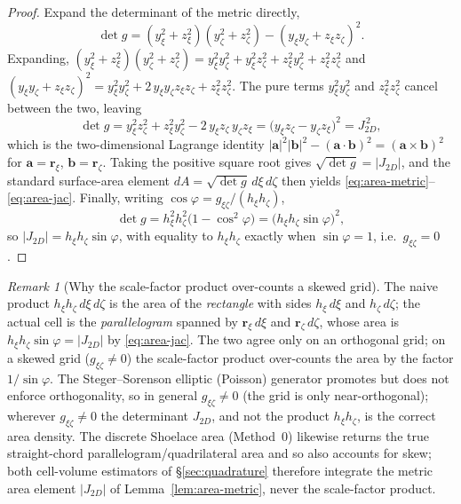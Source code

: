 \documentclass[11pt]{article}
\theoremstyle{definition}
\theoremstyle{remark}
\newtheorem{remark}{Remark}
\begin{document}
\begin{proof}
Expand the determinant of the metric directly,
\begin{equation}
\det g
=(y_\xi^2+z_\xi^2)(y_\zeta^2+z_\zeta^2)
 -(y_\xi y_\zeta+z_\xi z_\zeta)^2 .
\label{eq:detg-expand}
\end{equation}
Expanding,
$(y_\xi^2+z_\xi^2)(y_\zeta^2+z_\zeta^2)=y_\xi^2 y_\zeta^2+y_\xi^2 z_\zeta^2+z_\xi^2 y_\zeta^2+z_\xi^2 z_\zeta^2$
and
$(y_\xi y_\zeta+z_\xi z_\zeta)^2=y_\xi^2 y_\zeta^2+2\,y_\xi y_\zeta z_\xi z_\zeta+z_\xi^2 z_\zeta^2$.
The pure terms $y_\xi^2 y_\zeta^2$ and $z_\xi^2 z_\zeta^2$ cancel between the two,
leaving
\begin{equation}
\det g
=y_\xi^2 z_\zeta^2+z_\xi^2 y_\zeta^2-2\,y_\xi z_\zeta\,y_\zeta z_\xi
=\bigl(y_\xi z_\zeta-y_\zeta z_\xi\bigr)^2
=J_{2D}^{\,2},
\label{eq:lagrange-collapse}
\end{equation}
which is the two-dimensional Lagrange identity
$|\mathbf a|^2|\mathbf b|^2-(\mathbf a\!\cdot\!\mathbf b)^2=(\mathbf a\times\mathbf b)^2$
for $\mathbf a=\mathbf r_\xi$, $\mathbf b=\mathbf r_\zeta$. Taking the positive
square root gives $\sqrt{\det g}=|J_{2D}|$, and the standard surface-area element
$dA=\sqrt{\det g}\,d\xi\,d\zeta$ then yields \eqref{eq:area-metric}--\eqref{eq:area-jac}.
Finally, writing $\cos\varphi=g_{\xi\zeta}/(h_\xi h_\zeta)$,
\begin{equation}
\det g
=h_\xi^2 h_\zeta^2\bigl(1-\cos^2\varphi\bigr)
=\bigl(h_\xi h_\zeta\sin\varphi\bigr)^2,
\label{eq:detg-sin}
\end{equation}
so $|J_{2D}|=h_\xi h_\zeta\sin\varphi$, with equality to $h_\xi h_\zeta$ exactly
when $\sin\varphi=1$, i.e.\ $g_{\xi\zeta}=0$.
\end{proof}

\begin{remark}[Why the scale-factor product over-counts a skewed grid]
\label{rem:skew}
The naive product $h_\xi h_\zeta\,d\xi\,d\zeta$ is the area of the
\emph{rectangle} with sides $h_\xi\,d\xi$ and $h_\zeta\,d\zeta$; the actual cell
is the \emph{parallelogram} spanned by $\mathbf r_\xi\,d\xi$ and
$\mathbf r_\zeta\,d\zeta$, whose area is $h_\xi h_\zeta\sin\varphi=|J_{2D}|$ by
\eqref{eq:area-jac}. The two agree only on an orthogonal grid; on a skewed grid
($g_{\xi\zeta}\ne0$) the scale-factor product over-counts the area by the factor
$1/\sin\varphi$. The Steger--Sorenson elliptic (Poisson) generator promotes but
does not enforce orthogonality, so in general $g_{\xi\zeta}\neq0$ (the grid is only
near-orthogonal); wherever $g_{\xi\zeta}\neq0$ the determinant $J_{2D}$, and not the
product $h_\xi h_\zeta$, is the correct area density. The discrete Shoelace area
(Method~0) likewise returns the true straight-chord parallelogram/quadrilateral
area and so also accounts for skew; both cell-volume estimators of
\S\ref{sec:quadrature} therefore integrate the metric area element $|J_{2D}|$ of
Lemma~\ref{lem:area-metric}, never the scale-factor product.
\end{remark}
\end{document}
